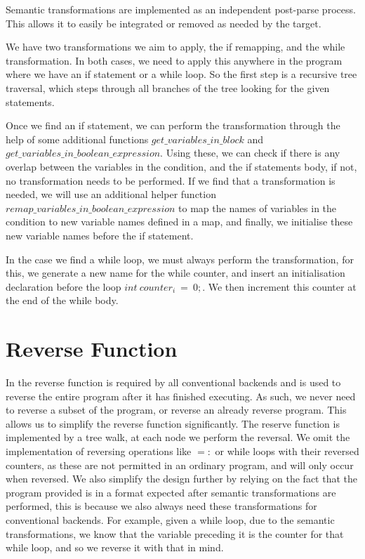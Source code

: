 Semantic transformations are implemented as an independent post-parse process. This allows it to easily be integrated or removed as needed by the target.

We have two transformations we aim to apply, the if remapping, and the while transformation. In both cases, we need to apply this anywhere in the program where we have an if statement or a while loop. So the first step is a recursive tree traversal, which steps through all branches of the tree looking for the given statements. 

Once we find an if statement, we can perform the transformation through the help of some additional functions $get\_variables\_in\_block$ and $get\_variables\_in\_boolean\_expression$. Using these, we can check if there is any overlap between the variables in the condition, and the if statements body, if not, no transformation needs to be performed. If we find that a transformation is needed, we will use an additional helper function $remap\_variables\_in\_boolean\_expression$ to map the names of variables in the condition to new variable names defined in a map, and finally, we initialise these new variable names before the if statement.

In the case we find a while loop, we must always perform the transformation, for this, we generate a new name for the while counter, and insert an initialisation declaration before the loop $int\ counter_i\ =\ 0;$. We then increment this counter at the end of the while body.

\section{Reverse Function}

In \rimp the reverse function is required by all conventional backends and is used to reverse the entire program after it has finished executing. As such, we never need to reverse a subset of the program, or reverse an already reverse program. This allows us to simplify the reverse function significantly. The reserve function is implemented by a tree walk, at each node we perform the reversal. We omit the implementation of reversing operations like $=:$ or while loops with their reversed counters, as these are not permitted in an ordinary \rimp program, and will only occur when reversed. 
We also simplify the design further by relying on the fact that the program provided is in a format expected after semantic transformations are performed, this is because we also always need these transformations for conventional backends. For example, given a while loop, due to the semantic transformations, we know that the variable preceding it is the counter for that while loop, and so we reverse it with that in mind.

